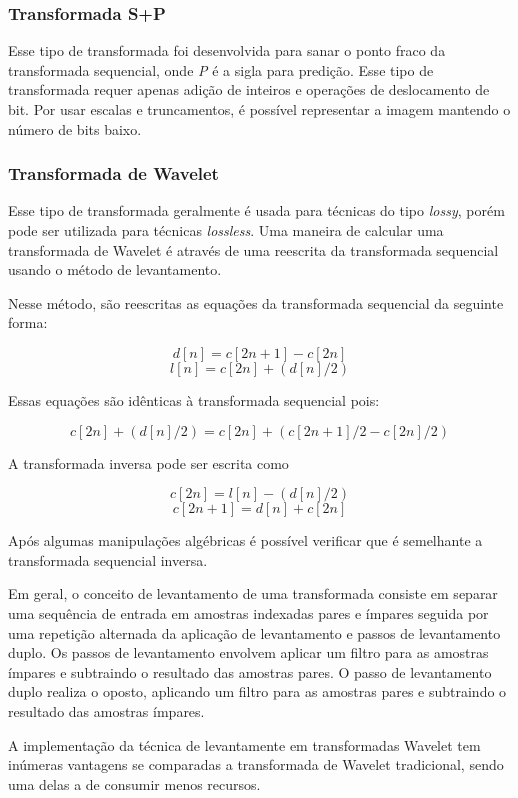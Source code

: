 \subsubsection{Transformada S+P}
\label{sss.sandptransform}

Esse tipo de transformada foi desenvolvida para sanar o ponto fraco da transformada sequencial, onde {\em P} é a sigla para predição. Esse tipo de transformada requer apenas adição de inteiros e operações de deslocamento de bit. Por usar escalas e truncamentos, é possível representar a imagem mantendo o número de bits baixo.

\subsubsection{Transformada de Wavelet}
\label{sss.wavelet}

Esse tipo de transformada geralmente é usada para técnicas do tipo {\em lossy}, porém pode ser utilizada para técnicas {\em lossless}. Uma maneira de calcular uma transformada de Wavelet é através de uma reescrita da transformada sequencial usando o método de levantamento.

Nesse método, são reescritas as equações da transformada sequencial da seguinte forma:

\[ d[n] = c[2n +1] - c[2n] \]
\[ l[n] = c[2n] + (d[n]/2) \]

Essas equações são idênticas à transformada sequencial pois:

\[ c[2n] + (d[n]/2) = c[2n] + (c[2n + 1]/2 - c[2n]/2) \]

A transformada inversa pode ser escrita como

\[ c[2n] = l[n] - (d[n]/2) \]
\[ c[2n + 1] = d[n] + c[2n] \]

Após algumas manipulações algébricas é possível verificar que é semelhante a transformada sequencial inversa.

Em geral, o conceito de levantamento de uma transformada consiste em separar uma sequência de entrada em amostras indexadas pares e ímpares seguida por uma repetição alternada da aplicação de levantamento e passos de levantamento duplo. Os passos de levantamento envolvem aplicar um filtro para as amostras ímpares e subtraindo o resultado das amostras pares. O passo de levantamento duplo realiza o oposto, aplicando um filtro para  as amostras pares e subtraindo o resultado das amostras ímpares.

A implementação da técnica de levantamente em transformadas Wavelet tem inúmeras vantagens se comparadas a transformada de Wavelet tradicional, sendo uma delas a de consumir menos recursos.

